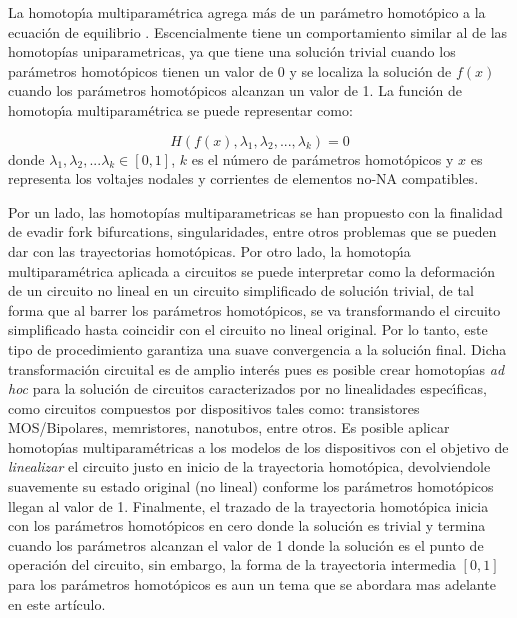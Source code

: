 \documentclass[conference,letterpaper,twocolumn]{IEEEtran}
\begin{document}
La homotop\'{\i}a multiparam\'etrica agrega m\'as de un par\'ametro homot\'opico a la ecuación de equilibrio \cite{homo_DWolfMulti}.
Escencialmente tiene un comportamiento similar al de las homotopías uniparametricas, ya que
tiene una soluci\'on trivial cuando los par\'ametros homotópicos tienen un valor de 0
y se localiza la solución de $f(x)$ cuando los parámetros homotópicos alcanzan un valor de 1.
La funci\'on de homotop\'{\i}a
multiparam\'etrica se puede representar como:

\begin{equation}
{H}({f}({x}),\lambda_1,\lambda_2,...,\lambda_k)=0
\end{equation} 
donde $\lambda_1,\lambda_2,...\lambda_k\in[0,1]$, $k$ es el n\'umero de par\'ametros homot\'opicos
y  $x$ es representa los voltajes nodales y corrientes de elementos no-NA compatibles.


Por un lado, las homotopías multiparametricas \cite{homo_DWolfMulti} se han propuesto con la finalidad
de evadir fork bifurcations, singularidades, entre otros problemas que se pueden dar con las trayectorias
homotópicas. Por otro lado, la homotop\'{\i}a multiparam\'etrica aplicada a circuitos se puede interpretar como la
deformaci\'on de un circuito no lineal en un circuito simplificado de solución trivial,
de tal forma que al barrer los par\'a\-me\-tros homot\'opicos, se va transformando el circuito
simplificado hasta coincidir con el circuito no lineal original.
Por lo tanto, este tipo de procedimiento garantiza una suave convergencia
a la soluci\'on final.
Dicha transformación circuital es de amplio inter\'es pues es posible
crear homotop\'{\i}as {\it ad hoc} para la soluci\'on de circuitos caracterizados
por no linealidades espec\'{\i}ficas, como circuitos compuestos por dispositivos tales como:
transistores MOS/Bipolares, memristores, nanotubos, entre otros.
Es posible aplicar homotop\'{\i}as multiparam\'etricas a los modelos
de los dispositivos con el objetivo de {\it linealizar} el circuito justo en inicio de la trayectoria
homotópica, devolviendole suavemente su estado original (no lineal) conforme los parámetros homotópicos llegan
al valor de 1. Finalmente, el trazado de la trayectoria homotópica
 inicia con los parámetros homotópicos en cero donde la soluci\'on es trivial
y termina cuando los parámetros alcanzan el valor de 1 donde la solución es el punto de operación del circuito, sin embargo, 
la forma de la trayectoria intermedia $[0,1]$ para los parámetros homotópicos es aun un tema que se abordara
mas adelante en este artículo.
\end{document}
